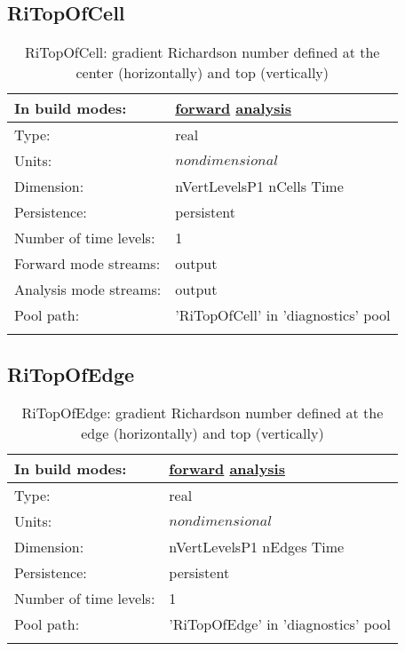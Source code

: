 \subsection[RiTopOfCell]{RiTopOfCell}
\label{subsec:var_sec_diagnostics_RiTopOfCell}
\begin{center}
\begin{longtable}{| p{2.0in} | p{4.0in} |}
        \hline 
        In build modes: & \hyperref[subsec:forward_var_tab_diagnostics]{forward} \hyperref[subsec:analysis_var_tab_diagnostics]{analysis} \\
        \hline 
        Type: & real \\
        \hline 
        Units: & $nondimensional$ \\
        \hline 
        Dimension: & nVertLevelsP1 nCells Time \\
        \hline 
        Persistence: & persistent \\
        \hline 
        Number of time levels: & 1 \\
        \hline 
		 Forward mode streams: &  output \\
        \hline 
		 Analysis mode streams: &  output \\
        \hline 
            Pool path: & 'RiTopOfCell' in 'diagnostics' pool
 \\
		 \hline 
    \caption{RiTopOfCell: gradient Richardson number defined at the center (horizontally) and top (vertically)}
\end{longtable}
\end{center}
\subsection[RiTopOfEdge]{RiTopOfEdge}
\label{subsec:var_sec_diagnostics_RiTopOfEdge}
\begin{center}
\begin{longtable}{| p{2.0in} | p{4.0in} |}
        \hline 
        In build modes: & \hyperref[subsec:forward_var_tab_diagnostics]{forward} \hyperref[subsec:analysis_var_tab_diagnostics]{analysis} \\
        \hline 
        Type: & real \\
        \hline 
        Units: & $nondimensional$ \\
        \hline 
        Dimension: & nVertLevelsP1 nEdges Time \\
        \hline 
        Persistence: & persistent \\
        \hline 
        Number of time levels: & 1 \\
        \hline 
            Pool path: & 'RiTopOfEdge' in 'diagnostics' pool
 \\
		 \hline 
    \caption{RiTopOfEdge: gradient Richardson number defined at the edge (horizontally) and top (vertically)}
\end{longtable}
\end{center}
